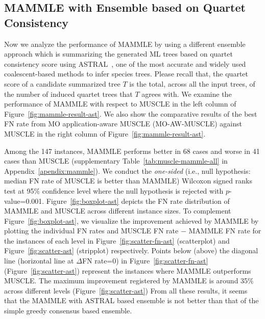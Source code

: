 \subsection{MAMMLE with Ensemble based on Quartet Consistency}
Now we analyze the performance of MAMMLE by using a different ensemble approach which is summarizing the generated ML trees based on quartet consistency score using ASTRAL~\cite{zhang2018astral}, one of the most accurate and widely used coalescent-based methods to infer species trees. Please recall that, the quartet score of a candidate summarized tree $T$ is the total, across all the input trees, of the number of induced quartet trees that $T$ agrees with. We examine the performance of MAMMLE with respect to MUSCLE in the left column of Figure~\ref{fig:mammle-result-ast}. We also show the comparative results of the best FN rate from MO application-aware MUSCLE (MO-AW-MUSCLE) against MUSCLE in the right column of Figure~\ref{fig:mammle-result-ast}.

Among the 147 instances, MAMMLE performs better in 68 cases and worse in 41 cases than MUSCLE (supplementary Table~\ref{tab:muscle-mammle-all} in Appendix~\ref{apendix:mammle}). We conduct the \textit{one-sided} (i.e., null hypothesis: median FN rate of MUSCLE is better than MAMMLE) Wilcoxon signed ranks test at 95\% confidence level where the null hypothesis is rejected with $p$-value=0.001. 
Figure~\ref{fig:boxplot-ast} depicts the FN rate distribution of MAMMLE and MUSCLE across different instance sizes. 
To complement Figure~\ref{fig:boxplot-ast}, we visualize the improvement achieved by MAMMLE by plotting the individual FN rates and MUSCLE FN rate $-$ MAMMLE FN rate for the instances of each level in Figure~\ref{fig:scatter-fn-ast} (scatterplot) and Figure~\ref{fig:scatter-ast} (stripplot) respectively. Points below (above) the diagonal line (horizontal line at $\Delta$FN rate=0) in Figure~\ref{fig:scatter-fn-ast} (Figure~\ref{fig:scatter-ast}) represent the instances where MAMMLE outperforms MUSCLE. The maximum improvement registered by MAMMLE is around 35\% across different levels (Figure~\ref{fig:scatter-ast})
From all these results, it seems that the MAMMLE with ASTRAL based ensemble is not better than that of the simple greedy consensus based ensemble. 

